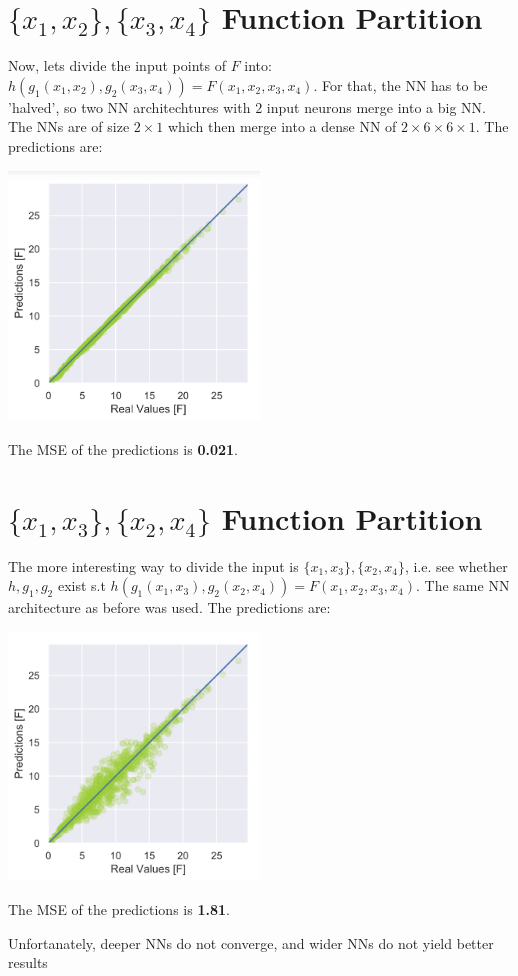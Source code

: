 \documentclass[12pt, conference]{IEEEtran}
\begin{document}
\begin{spacing}{1.5}
		\section{$\{x_1,x_2\},\{x_3,x_4\}$ Function Partition}
			Now, lets divide the input points of $F$ into: $h(g_1(x_1,x_2),g_2(x_3,x_4)) = F(x_1,x_2,x_3,x_4)$.
			For that, the NN has to be 'halved', so two NN architechtures with $2$ input neurons merge into a big NN.
			The NNs are of size $2\times1$ which then merge into a dense NN of $2\times6\times6\times1$.
			The predictions are:
			\begin{center}
				\includegraphics[width=0.5\textwidth]{Figures/bottlenecked_nn_good_partition.png}
			\end{center}
			The MSE of the predictions is \textbf{0.021}.
		
		\section{$\{x_1,x_3\},\{x_2,x_4\}$ Function Partition}
			The more interesting way to divide the input is $\{x_1,x_3\},\{x_2,x_4\}$, i.e. see whether $h,g_1,g_2$ exist s.t $h(g_1(x_1,x_3),g_2(x_2,x_4)) = F(x_1,x_2,x_3,x_4)$.
			The same NN architecture as before was used.
			The predictions are:
			\begin{center}
				\includegraphics[width=0.5\textwidth]{Figures/bottlenecked_nn_bad_partition.png}
			\end{center}
			The MSE of the predictions is \textbf{1.81}.
			
			Unfortanately, deeper NNs do not converge, and wider NNs do not yield better results
    \end{spacing}
    
\end{document}
